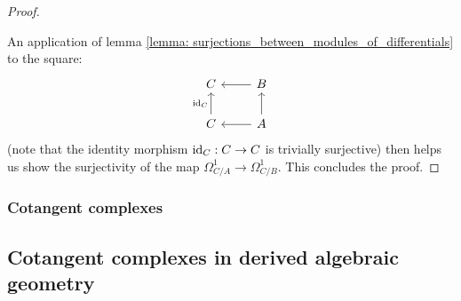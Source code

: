 \begin{proof}
\begin{itemize}
                        \end{itemize}
                    An application of lemma \ref{lemma: surjections_between_modules_of_differentials} to the square:
                        $$
                            \begin{tikzcd}
                            	C & B \\
                            	C & A
                            	\arrow["{\id_C}", from=2-1, to=1-1]
                            	\arrow[from=2-2, to=1-2]
                            	\arrow[from=1-2, to=1-1]
                            	\arrow[from=2-2, to=2-1]
                            \end{tikzcd}
                        $$
                    (note that the identity morphism $\mathrm{id}_C: C \to C$ is trivially surjective) then helps us show the surjectivity of the map $\Omega^1_{C/A} \to \Omega^1_{C/B}$. This concludes the proof.
                \end{proof}
                
        \subsubsection{Cotangent complexes}

    \subsection{Cotangent complexes in derived algebraic geometry}